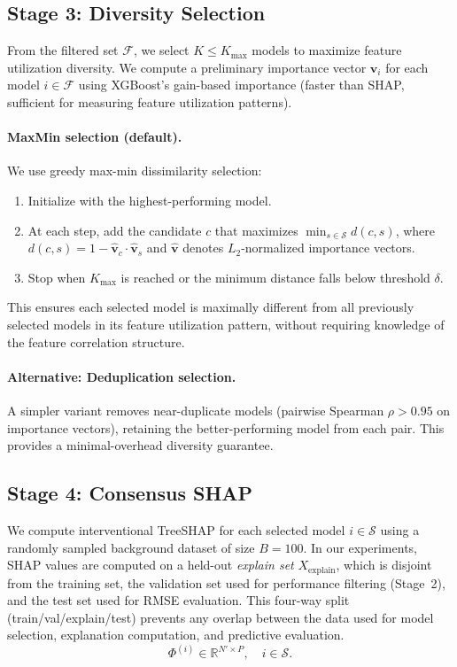 \documentclass[11pt]{article}
\newcommand{\rhovar}{\rho}
\begin{document}
\subsection{Stage 3: Diversity Selection}

From the filtered set $\mathcal{F}$, we select $K \leq K_{\max}$
models to maximize feature utilization diversity. We compute a
preliminary importance vector $\mathbf{v}_i$ for each model $i \in
\mathcal{F}$ using XGBoost's gain-based importance (faster than SHAP,
sufficient for measuring feature utilization patterns).

\paragraph{MaxMin selection (default).}
We use greedy max-min dissimilarity selection:
\begin{enumerate}
  \item Initialize with the highest-performing model.
  \item At each step, add the candidate $c$ that maximizes
    $\min_{s \in \mathcal{S}} d(c, s)$, where
    $d(c, s) = 1 - \hat{\mathbf{v}}_c \cdot \hat{\mathbf{v}}_s$
    and $\hat{\mathbf{v}}$ denotes $L_2$-normalized importance vectors.
  \item Stop when $K_{\max}$ is reached or the minimum distance falls
    below threshold $\delta$.
\end{enumerate}

This ensures each selected model is maximally different from all previously
selected models in its feature utilization pattern, without requiring
knowledge of the feature correlation structure.

\paragraph{Alternative: Deduplication selection.}
A simpler variant removes near-duplicate models (pairwise Spearman
$\rhovar > 0.95$ on importance vectors), retaining the better-performing
model from each pair. This provides a minimal-overhead diversity guarantee.

\subsection{Stage 4: Consensus SHAP}

We compute interventional TreeSHAP \citep{lundberg2020local} for each
selected model $i \in \mathcal{S}$ using a randomly sampled background
dataset of size $B = 100$. In our experiments, SHAP values are computed
on a held-out \emph{explain set} $X_{\text{explain}}$, which is disjoint
from the training set, the validation set used for performance filtering
(Stage~2), and the test set used for RMSE evaluation. This four-way split
(train/val/explain/test) prevents any overlap between the data used for
model selection, explanation computation, and predictive evaluation.
\begin{equation}
  \Phi^{(i)} \in \mathbb{R}^{N' \times P}, \quad i \in \mathcal{S}.
\end{equation}
\end{document}
